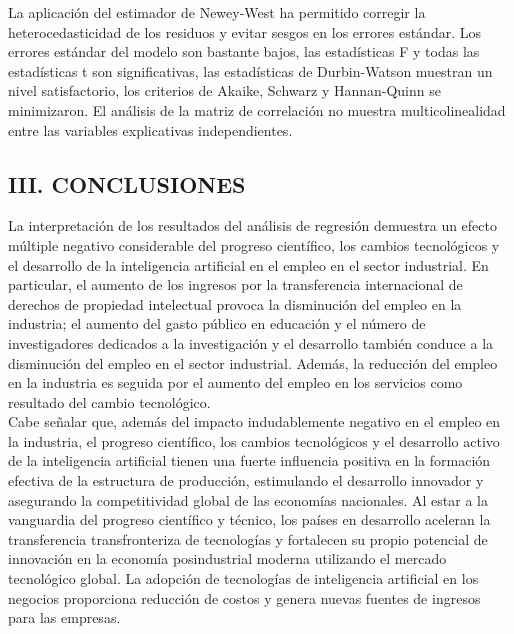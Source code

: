 La aplicación del estimador de Newey-West ha permitido corregir la heterocedasticidad de los residuos y evitar sesgos en los errores estándar. Los errores estándar del modelo son bastante bajos, las estadísticas F y todas las estadísticas t son significativas, las estadísticas de Durbin-Watson muestran un nivel satisfactorio, los criterios de Akaike, Schwarz y Hannan-Quinn se minimizaron. El análisis de la matriz de correlación no muestra multicolinealidad entre las variables explicativas independientes.\\

\subsection*{\center III. CONCLUSIONES}
La interpretación de los resultados del análisis de regresión demuestra un efecto múltiple negativo considerable del progreso científico, los cambios tecnológicos y el desarrollo de la inteligencia artificial en el empleo en el sector industrial. En particular, el aumento de los ingresos por la transferencia internacional de derechos de propiedad intelectual provoca la disminución del empleo en la industria; el aumento del gasto público en educación y el número de investigadores dedicados a la investigación y el desarrollo también conduce a la disminución del empleo en el sector industrial. Además, la reducción del empleo en la industria es seguida por el aumento del empleo en los servicios como resultado del cambio tecnológico.\\

Cabe señalar que, además del impacto indudablemente negativo en el empleo en la industria, el progreso científico, los cambios tecnológicos y el desarrollo activo de la inteligencia artificial tienen una fuerte influencia positiva en la formación efectiva de la estructura de producción, estimulando el desarrollo innovador y asegurando la competitividad global de las economías nacionales. Al estar a la vanguardia del progreso científico y técnico, los países en desarrollo aceleran la transferencia transfronteriza de tecnologías y fortalecen su propio potencial de innovación en la economía posindustrial moderna utilizando el mercado tecnológico global. La adopción de tecnologías de inteligencia artificial en los negocios proporciona reducción de costos y genera nuevas fuentes de ingresos para las empresas.\\

